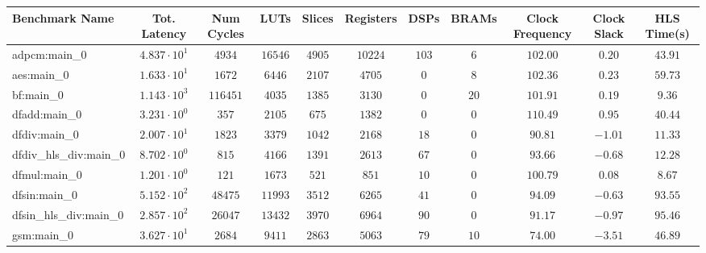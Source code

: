 \begin{tabular}{|l|c|c|c|c|c|c|c|c|c|c|}
\hline
Benchmark Name          & Tot. Latency           & Num Cycles & LUTs       & Slices    & Registers & DSPs    & BRAMs   & Clock Frequency & Clock Slack & HLS Time(s) \\
\hline
adpcm:main\_0           & $ 4.837 \cdot 10^{1} $ & $ 4934   $ & $ 16546  $ & $ 4905  $ & $ 10224 $ & $ 103 $ & $ 6   $ & $ 102.00      $ & $ 0.20    $ & $ 43.91   $ \\
aes:main\_0             & $ 1.633 \cdot 10^{1} $ & $ 1672   $ & $ 6446   $ & $ 2107  $ & $ 4705  $ & $ 0   $ & $ 8   $ & $ 102.36      $ & $ 0.23    $ & $ 59.73   $ \\
bf:main\_0              & $ 1.143 \cdot 10^{3} $ & $ 116451 $ & $ 4035   $ & $ 1385  $ & $ 3130  $ & $ 0   $ & $ 20  $ & $ 101.91      $ & $ 0.19    $ & $ 9.36    $ \\
dfadd:main\_0           & $ 3.231 \cdot 10^{0} $ & $ 357    $ & $ 2105   $ & $ 675   $ & $ 1382  $ & $ 0   $ & $ 0   $ & $ 110.49      $ & $ 0.95    $ & $ 40.44   $ \\
dfdiv:main\_0           & $ 2.007 \cdot 10^{1} $ & $ 1823   $ & $ 3379   $ & $ 1042  $ & $ 2168  $ & $ 18  $ & $ 0   $ & $ 90.81       $ & $ -1.01   $ & $ 11.33   $ \\
dfdiv\_hls\_div:main\_0 & $ 8.702 \cdot 10^{0} $ & $ 815    $ & $ 4166   $ & $ 1391  $ & $ 2613  $ & $ 67  $ & $ 0   $ & $ 93.66       $ & $ -0.68   $ & $ 12.28   $ \\
dfmul:main\_0           & $ 1.201 \cdot 10^{0} $ & $ 121    $ & $ 1673   $ & $ 521   $ & $ 851   $ & $ 10  $ & $ 0   $ & $ 100.79      $ & $ 0.08    $ & $ 8.67    $ \\
dfsin:main\_0           & $ 5.152 \cdot 10^{2} $ & $ 48475  $ & $ 11993  $ & $ 3512  $ & $ 6265  $ & $ 41  $ & $ 0   $ & $ 94.09       $ & $ -0.63   $ & $ 93.55   $ \\
dfsin\_hls\_div:main\_0 & $ 2.857 \cdot 10^{2} $ & $ 26047  $ & $ 13432  $ & $ 3970  $ & $ 6964  $ & $ 90  $ & $ 0   $ & $ 91.17       $ & $ -0.97   $ & $ 95.46   $ \\
gsm:main\_0             & $ 3.627 \cdot 10^{1} $ & $ 2684   $ & $ 9411   $ & $ 2863  $ & $ 5063  $ & $ 79  $ & $ 10  $ & $ 74.00       $ & $ -3.51   $ & $ 46.89   $ \\

\end{tabular}
